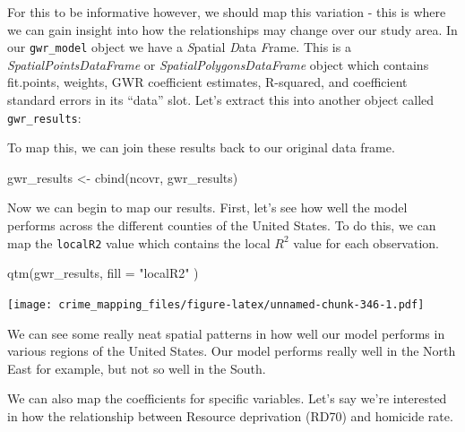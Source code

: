 \documentclass[
  krantz2]{krantz}
\makeatletter
\newenvironment{Shaded}{\begin{snugshade}}{\end{snugshade}}
\newcommand{\AttributeTok}[1]{\textcolor[rgb]{0.61,0.61,0.61}{#1}}
\newcommand{\FunctionTok}[1]{\textcolor[rgb]{0,0,0}{#1}}
\newcommand{\NormalTok}[1]{#1}
\newcommand{\OtherTok}[1]{\textcolor[rgb]{0.37,0.37,0.37}{#1}}
\newcommand{\SpecialCharTok}[1]{\textcolor[rgb]{0,0,0}{#1}}
\newcommand{\StringTok}[1]{\textcolor[rgb]{0.5,0.5,0.5}{#1}}
\newenvironment{kframe}{%
\medskip{}
\setlength{\fboxsep}{.8em}
 \def\at@end@of@kframe{}%
 \ifinner\ifhmode%
  \def\at@end@of@kframe{\end{minipage}}%
  \begin{minipage}{\columnwidth}%
 \fi\fi%
 \def\FrameCommand##1{\hskip\@totalleftmargin \hskip-\fboxsep
 \colorbox{shadecolor}{##1}\hskip-\fboxsep
     \hskip-\linewidth \hskip-\@totalleftmargin \hskip\columnwidth}%
 \MakeFramed {\advance\hsize-\width
   \@totalleftmargin\z@ \linewidth\hsize
   \@setminipage}}%
 {\par\unskip\endMakeFramed%
 \at@end@of@kframe}
\renewenvironment{Shaded}{\begin{kframe}}{\end{kframe}}
\makeatother
\begin{document}
For this to be informative however, we should map this variation - this is where we can gain insight into how the relationships may change over our study area. In our \texttt{gwr\_model} object we have a \emph{S}patial \emph{D}ata \emph{F}rame. This is a \emph{SpatialPointsDataFrame} or \emph{SpatialPolygonsDataFrame} object which contains fit.points, weights, GWR coefficient estimates, R-squared, and coefficient standard errors in its ``data'' slot. Let's extract this into another object called \texttt{gwr\_results}:

\begin{Shaded}
\end{Shaded}

To map this, we can join these results back to our original data frame.

\begin{Shaded}
\begin{Highlighting}[]
\NormalTok{gwr\_results }\OtherTok{\textless{}{-}} \FunctionTok{cbind}\NormalTok{(ncovr, gwr\_results)}
\end{Highlighting}
\end{Shaded}

Now we can begin to map our results. First, let's see how well the model performs across the different counties of the United States. To do this, we can map the \texttt{localR2} value which contains the local \(R^2\) value for each observation.

\begin{Shaded}
\begin{Highlighting}[]
\FunctionTok{qtm}\NormalTok{(gwr\_results, }\AttributeTok{fill =}  \StringTok{"localR2"}\NormalTok{ )}
\end{Highlighting}
\end{Shaded}

\texttt{[image: crime\_mapping\_files/figure-latex/unnamed-chunk-346-1.pdf]}

We can see some really neat spatial patterns in how well our model performs in various regions of the United States. Our model performs really well in the North East for example, but not so well in the South.

We can also map the coefficients for specific variables. Let's say we're interested in how the relationship between Resource deprivation (RD70) and homicide rate.
\end{document}
